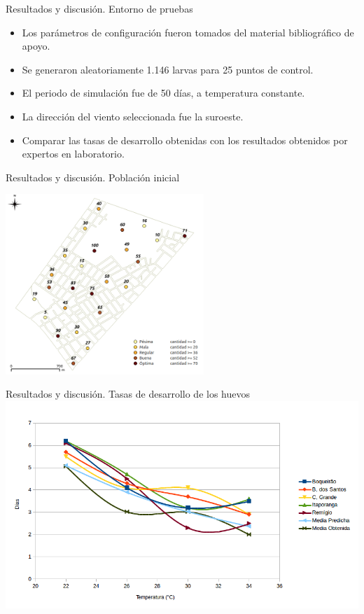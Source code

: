 \begin{frame}[t]{Resultados y discusión. Entorno de pruebas}
\begin{itemize}
    \item Los parámetros de configuración fueron tomados del material bibliográfico de apoyo.
    \item Se generaron aleatoriamente 1.146 larvas para 25 puntos de control.
    \item El periodo de simulación fue de 50 días, a temperatura constante.
    \item La dirección del viento seleccionada fue la suroeste.
    \item Comparar las tasas de desarrollo obtenidas con los resultados obtenidos por expertos en laboratorio.
    \end{itemize}
\end{frame}

\begin{frame}[t]{Resultados y discusión. Población inicial}
    \begin{center}
        \includegraphics[width=7.5cm]{./graphics/extension-poblacion.png}
    \end{center}
\end{frame}

\begin{frame}[t]{Resultados y discusión. Tasas de desarrollo de los huevos}
    \includegraphics[width=\textwidth]{./graphics/huevos-desarrollo.png}
\end{frame}

